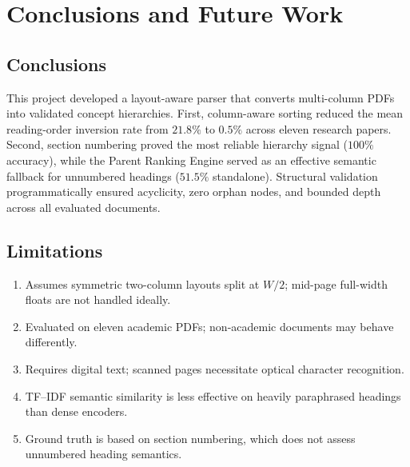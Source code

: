 \documentclass[12pt,a4paper]{report}
\begin{document}
\chapter{Conclusions and Future Work}
\vspace{-2mm}

\section{Conclusions}
This project developed a layout-aware parser that converts multi-column PDFs into validated
concept hierarchies. First, column-aware sorting reduced the mean reading-order inversion
rate from $21.8\%$ to $0.5\%$ across eleven research papers. Second, section numbering
proved the most reliable hierarchy signal ($100\%$ accuracy), while the Parent Ranking
Engine served as an effective semantic fallback for unnumbered headings ($51.5\%$ standalone).
Structural validation programmatically ensured acyclicity, zero orphan nodes, and bounded
depth across all evaluated documents.

\section{Limitations}
\begin{enumerate}\setlength{\itemsep}{1pt}\setlength{\parskip}{0pt}\setlength{\parsep}{0pt}
  \item Assumes symmetric two-column layouts split at $W/2$; mid-page full-width floats are not handled ideally.
  \item Evaluated on eleven academic PDFs; non-academic documents may behave differently.
  \item Requires digital text; scanned pages necessitate optical character recognition.
  \item TF--IDF semantic similarity is less effective on heavily paraphrased headings than dense encoders.
  \item Ground truth is based on section numbering, which does not assess unnumbered heading semantics.
\end{enumerate}
\end{document}
